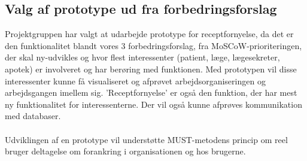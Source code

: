 \subsection{Valg af prototype ud fra forbedringsforslag}
Projektgruppen har valgt at udarbejde prototype for receptfornyelse, da det er den funktionalitet blandt vores 3 forbedringsforslag, fra MoSCoW-prioriteringen, der skal ny-udvikles og hvor flest interessenter (patient, læge, lægesekreter, apotek) er involveret og har berøring med funktionen. Med prototypen vil disse interessenter kunne få visualiseret og afprøvet arbejdsorganiseringen og arbejdsgangen imellem sig. ’Receptfornyelse’ er også den funktion, der har mest ny funktionalitet for interessenterne. 
Der vil også kunne afprøves kommunikation med databaser. \\ 
\\
Udviklingen af en prototype vil understøtte MUST-metodens princip om reel bruger deltagelse om forankring i organisationen og hos brugerne.
